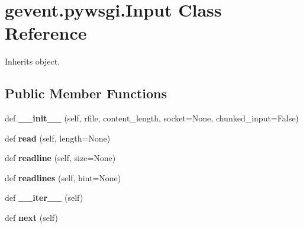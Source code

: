 \hypertarget{classgevent_1_1pywsgi_1_1_input}{}\section{gevent.\+pywsgi.\+Input Class Reference}
\label{classgevent_1_1pywsgi_1_1_input}


Inherits object.

\subsection*{Public Member Functions}
\begin{DoxyCompactItemize}
\item 
\mbox{\label{classgevent_1_1pywsgi_1_1_input_a66facead155cb0b4a99363dad6bd2df9}} 
def {\bfseries \+\_\+\+\_\+init\+\_\+\+\_\+} (self, rfile, content\+\_\+length, socket=None, chunked\+\_\+input=False)
\item 
\mbox{\label{classgevent_1_1pywsgi_1_1_input_a16af1b75109fe0d09a84b9bff28f5392}} 
def {\bfseries read} (self, length=None)
\item 
\mbox{\label{classgevent_1_1pywsgi_1_1_input_aaaef6d031ba1e6b900b0e43b64630f13}} 
def {\bfseries readline} (self, size=None)
\item 
\mbox{\label{classgevent_1_1pywsgi_1_1_input_abe58d8255602f0452a8c036291da698a}} 
def {\bfseries readlines} (self, hint=None)
\item 
\mbox{\label{classgevent_1_1pywsgi_1_1_input_acb90e0f6ba11690635d174fa6529501b}} 
def {\bfseries \+\_\+\+\_\+iter\+\_\+\+\_\+} (self)
\item 
\mbox{\label{classgevent_1_1pywsgi_1_1_input_a8360e83fb9013fda9819c7ea53bb542e}} 
def {\bfseries next} (self)
\end{DoxyCompactItemize}
